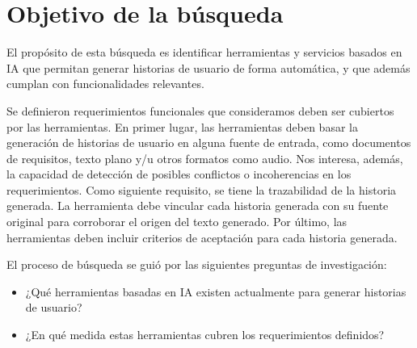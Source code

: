 \section{Objetivo de la búsqueda}
El propósito de esta búsqueda es identificar herramientas y servicios basados en IA que permitan generar historias de usuario de forma automática, y que además cumplan con funcionalidades relevantes.

Se definieron requerimientos funcionales que consideramos deben ser cubiertos por las herramientas. En primer lugar, las herramientas deben basar la generación de historias de usuario en alguna fuente de entrada, como documentos de requisitos, texto plano y/u otros formatos como audio. Nos interesa, además, la capacidad de detección de posibles conflictos o incoherencias en los requerimientos.
Como siguiente requisito, se tiene la trazabilidad de la historia generada. La herramienta debe vincular cada historia generada con su fuente original para corroborar el origen del texto generado. Por último, las herramientas deben incluir criterios de aceptación para cada historia generada.

El proceso de búsqueda se guió por las siguientes preguntas de investigación:
\begin{itemize}
    \item ¿Qué herramientas basadas en IA existen actualmente para generar historias de usuario?
    \item ¿En qué medida estas herramientas cubren los requerimientos definidos?
\end{itemize}

